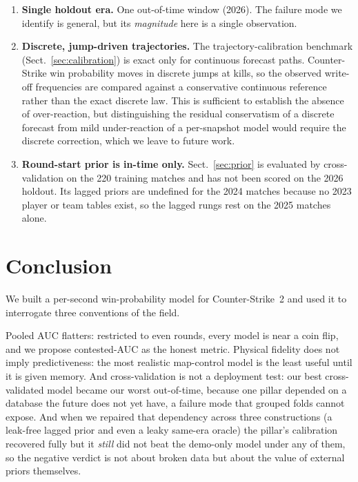\documentclass[11pt,a4paper]{article}
\begin{document}
\begin{enumerate}
    they ingest every feature column, they inherit the firepower penalty and cannot be run in a
    ``no-firepower'' configuration without retraining on a reduced column set, which we did not do. A
    deep model restricted to the demo-derived pillars might close the small gap to EB2; we leave that
    to future work.
  \item \textbf{Single holdout era.} One out-of-time window (2026). The failure mode we identify is
    general, but its \emph{magnitude} here is a single observation.
  \item \textbf{Discrete, jump-driven trajectories.} The trajectory-calibration benchmark
    (Sect.~\ref{sec:calibration}) is exact only for continuous forecast paths. Counter-Strike win
    probability moves in discrete jumps at kills, so the observed write-off frequencies are compared
    against a conservative continuous reference rather than the exact discrete law. This is sufficient
    to establish the absence of over-reaction, but distinguishing the residual conservatism of a
    discrete forecast from mild under-reaction of a per-snapshot model would require the discrete
    correction, which we leave to future work.
  \item \textbf{Round-start prior is in-time only.} Sect.~\ref{sec:prior} is evaluated by
    cross-validation on the 220 training matches and has not been scored on the 2026 holdout. Its
    lagged priors are undefined for the 2024 matches because no 2023 player or team tables exist, so
    the lagged rungs rest on the 2025 matches alone.
\end{enumerate}

\section{Conclusion}
\label{sec:conclusion}

We built a per-second win-probability model for Counter-Strike~2 and used it to interrogate three
conventions of the field.

Pooled AUC flatters: restricted to even rounds, every model is near a coin flip, and we propose
contested-AUC as the honest metric. Physical fidelity does not imply predictiveness: the most
realistic map-control model is the least useful until it is given memory. And cross-validation is
not a deployment test: our best cross-validated model became our worst out-of-time, because one
pillar depended on a database the future does not yet have, a failure mode that grouped folds
cannot expose. And when we repaired that dependency across three constructions (a leak-free lagged
prior and even a leaky same-era oracle) the pillar's calibration recovered fully but it \emph{still}
did not beat the demo-only model under any of them, so the negative verdict is not about broken data
but about the value of external priors themselves.
\end{document}
